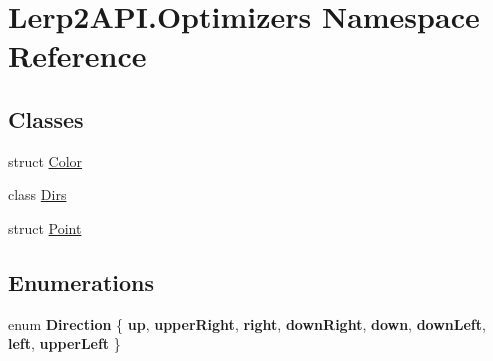\hypertarget{namespace_lerp2_a_p_i_1_1_optimizers}{}\section{Lerp2\+A\+P\+I.\+Optimizers Namespace Reference}
\label{namespace_lerp2_a_p_i_1_1_optimizers}
\subsection*{Classes}
\begin{DoxyCompactItemize}
\item 
struct \hyperlink{struct_lerp2_a_p_i_1_1_optimizers_1_1_color}{Color}
\item 
class \hyperlink{class_lerp2_a_p_i_1_1_optimizers_1_1_dirs}{Dirs}
\item 
struct \hyperlink{struct_lerp2_a_p_i_1_1_optimizers_1_1_point}{Point}
\end{DoxyCompactItemize}
\subsection*{Enumerations}
\begin{DoxyCompactItemize}
\item 
\mbox{\label{namespace_lerp2_a_p_i_1_1_optimizers_a159a6f85bec1076b8b34d5da86c7cafe}} 
enum {\bfseries Direction} \{ \newline
{\bfseries up}, 
{\bfseries upper\+Right}, 
{\bfseries right}, 
{\bfseries down\+Right}, 
\newline
{\bfseries down}, 
{\bfseries down\+Left}, 
{\bfseries left}, 
{\bfseries upper\+Left}
 \}
\end{DoxyCompactItemize}
